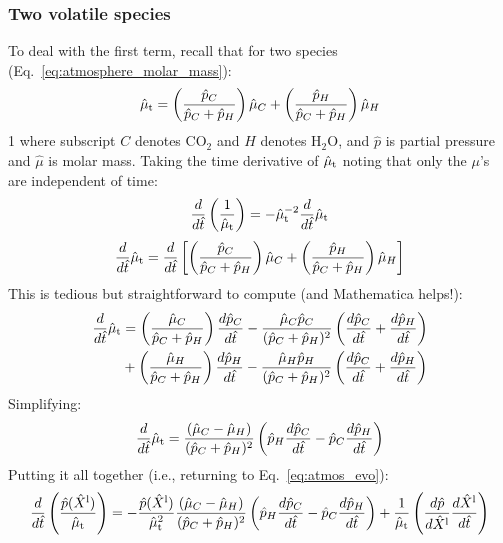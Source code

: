 \subsubsection{Two volatile species}
To deal with the first term, recall that for two species (Eq.~\ref{eq:atmosphere_molar_mass}):
\begin{equation}
\hat{\mu}_{\rm t} = \left( \frac{\hat{p}_C}{\hat{p}_C+\hat{p}_H} \right) \hat{\mu}_C + \left( \frac{\hat{p}_H}{\hat{p}_C+\hat{p}_H} \right) \hat{\mu}_H
\end{equation}1
where subscript $C$ denotes CO$_2$ and $H$ denotes H$_2$O, and $\hat{p}$ is partial pressure and $\hat{\mu}$ is molar mass.  Taking the time derivative of $\hat{\mu}_{\rm t}$ noting that only the $\mu$'s are independent of time:
\begin{equation}
\frac{d}{d\hat{t}} \left( \frac{1}{\hat{\mu}_{\rm t}} \right) = -\hat{\mu}_{\rm t}^{-2} \frac{d}{d\hat{t}} \hat{\mu}_{\rm t}
\end{equation}
\begin{equation}
\frac{d}{d\hat{t}} \hat{\mu}_{\rm t} = \frac{d}{d\hat{t}} \left[ \left( \frac{\hat{p}_C}{\hat{p}_C+\hat{p}_H} \right) \hat{\mu}_C + \left( \frac{\hat{p}_H}{\hat{p}_C+\hat{p}_H} \right) \hat{\mu}_H \right]
\end{equation}
This is tedious but straightforward to compute (and Mathematica helps!):
\begin{align}
\frac{d}{d\hat{t}} \hat{\mu}_{\rm t} &= \left( \frac{\hat{\mu}_C}{\hat{p}_C+\hat{p}_H} \right) \frac{d\hat{p}_C}{d\hat{t}} - \frac{\hat{\mu}_C \hat{p}_C}{(\hat{p}_C+\hat{p}_H)^2} \left( \frac{d\hat{p}_C}{d\hat{t}}+\frac{d\hat{p}_H}{d\hat{t}} \right)\\
&+ \left( \frac{\hat{\mu}_H}{\hat{p}_C+\hat{p}_H} \right) \frac{d\hat{p}_H}{d\hat{t}} - \frac{\hat{\mu}_H \hat{p}_H}{(\hat{p}_C+\hat{p}_H)^2} \left( \frac{d\hat{p}_C}{d\hat{t}}+\frac{d\hat{p}_H}{d\hat{t}} \right)
\end{align}
Simplifying:
\begin{equation}
\frac{d}{d\hat{t}} \hat{\mu}_{\rm t} = \frac{(\hat{\mu}_C-\hat{\mu}_H)}{(\hat{p}_C+\hat{p}_H)^2} \left( \hat{p}_H \frac{d\hat{p}_C}{d\hat{t}} - \hat{p}_C \frac{d\hat{p}_H}{d\hat{t}} \right)
\end{equation}
Putting it all together (i.e., returning to Eq.~\ref{eq:atmos_evo}):
\begin{equation}
\frac{d}{d\hat{t}} \left( \frac{\hat{p}(\hat{X}^{\rm l})}{\hat{\mu}_{\rm t}} \right) = -\frac{\hat{p}(\hat{X}^{\rm l})}{\hat{\mu}_{\rm t}^2} \frac{(\hat{\mu}_C-\hat{\mu}_H)}{(\hat{p}_C+\hat{p}_H)^2} \left( \hat{p}_H \frac{d\hat{p}_C}{d\hat{t}} - \hat{p}_C \frac{d\hat{p}_H}{d\hat{t}} \right) + \frac{1}{\hat{\mu}_{\rm t}} \left( \frac{d \hat{p}}{d \hat{X}^{\rm l}} \frac{d \hat{X}^{\rm l}}{d\hat{t}} \right)
\end{equation}
